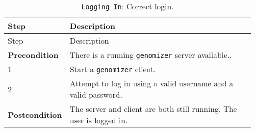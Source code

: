 \begin{longtable}[c]{@{}ll@{}}
\caption{\texttt{Logging\ In}: Correct login.}\tabularnewline
\toprule
\begin{minipage}[b]{0.31\columnwidth}\raggedright\strut
Step
\strut\end{minipage} &
\begin{minipage}[b]{0.63\columnwidth}\raggedright\strut
Description
\strut\end{minipage}\tabularnewline
\midrule
\endfirsthead
\toprule
\begin{minipage}[b]{0.31\columnwidth}\raggedright\strut
Step
\strut\end{minipage} &
\begin{minipage}[b]{0.63\columnwidth}\raggedright\strut
Description
\strut\end{minipage}\tabularnewline
\midrule
\endhead
\begin{minipage}[t]{0.31\columnwidth}\raggedright\strut
\textbf{Precondition}
\strut\end{minipage} &
\begin{minipage}[t]{0.63\columnwidth}\raggedright\strut
There is a running \texttt{genomizer} server available..
\strut\end{minipage}\tabularnewline
\begin{minipage}[t]{0.31\columnwidth}\raggedright\strut
1
\strut\end{minipage} &
\begin{minipage}[t]{0.63\columnwidth}\raggedright\strut
Start a \texttt{genomizer} client.
\strut\end{minipage}\tabularnewline
\begin{minipage}[t]{0.31\columnwidth}\raggedright\strut
2
\strut\end{minipage} &
\begin{minipage}[t]{0.63\columnwidth}\raggedright\strut
Attempt to log in using a valid username and a valid password.
\strut\end{minipage}\tabularnewline
\begin{minipage}[t]{0.31\columnwidth}\raggedright\strut
\textbf{Postcondition}
\strut\end{minipage} &
\begin{minipage}[t]{0.63\columnwidth}\raggedright\strut
The server and client are both still running. The user is logged in.
\strut\end{minipage}\tabularnewline
\bottomrule
\end{longtable}

